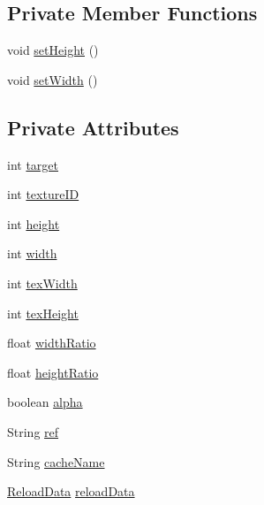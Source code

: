 \subsection*{Private Member Functions}
\begin{DoxyCompactItemize}
\item 
void \mbox{\hyperlink{classorg_1_1newdawn_1_1slick_1_1opengl_1_1_texture_impl_a8a0e3f81daf28807c80daac7e3927808}{set\+Height}} ()
\item 
void \mbox{\hyperlink{classorg_1_1newdawn_1_1slick_1_1opengl_1_1_texture_impl_acac95e7726dd15b2fed3e6370f69f11e}{set\+Width}} ()
\end{DoxyCompactItemize}
\subsection*{Private Attributes}
\begin{DoxyCompactItemize}
\item 
int \mbox{\hyperlink{classorg_1_1newdawn_1_1slick_1_1opengl_1_1_texture_impl_a5809d68afec3342e54fc4520f04a596a}{target}}
\item 
int \mbox{\hyperlink{classorg_1_1newdawn_1_1slick_1_1opengl_1_1_texture_impl_a6dba48b815f4fc5a37e9c4390f349c9e}{texture\+ID}}
\item 
int \mbox{\hyperlink{classorg_1_1newdawn_1_1slick_1_1opengl_1_1_texture_impl_a53e8d062d8f983a3a1a845d34bdbd834}{height}}
\item 
int \mbox{\hyperlink{classorg_1_1newdawn_1_1slick_1_1opengl_1_1_texture_impl_a73412d6372fabe2942ffa281f91a830c}{width}}
\item 
int \mbox{\hyperlink{classorg_1_1newdawn_1_1slick_1_1opengl_1_1_texture_impl_acb22083c60049df21f8e484413d73212}{tex\+Width}}
\item 
int \mbox{\hyperlink{classorg_1_1newdawn_1_1slick_1_1opengl_1_1_texture_impl_afa18dcc63658ee42ca8f6a2822f18c1d}{tex\+Height}}
\item 
float \mbox{\hyperlink{classorg_1_1newdawn_1_1slick_1_1opengl_1_1_texture_impl_a724dda9aa9dc49dee3f80d62cdd68fa9}{width\+Ratio}}
\item 
float \mbox{\hyperlink{classorg_1_1newdawn_1_1slick_1_1opengl_1_1_texture_impl_a8df2772434fe39ed8a5ad06042515385}{height\+Ratio}}
\item 
boolean \mbox{\hyperlink{classorg_1_1newdawn_1_1slick_1_1opengl_1_1_texture_impl_a315687e46129b509c38a9f0ab10adee4}{alpha}}
\item 
String \mbox{\hyperlink{classorg_1_1newdawn_1_1slick_1_1opengl_1_1_texture_impl_af482ec27b29b8846d98ce87bfcd88223}{ref}}
\item 
String \mbox{\hyperlink{classorg_1_1newdawn_1_1slick_1_1opengl_1_1_texture_impl_a2b5b9b6700d8cc41e1bd79adbf2bf8fc}{cache\+Name}}
\item 
\mbox{\hyperlink{classorg_1_1newdawn_1_1slick_1_1opengl_1_1_texture_impl_1_1_reload_data}{Reload\+Data}} \mbox{\hyperlink{classorg_1_1newdawn_1_1slick_1_1opengl_1_1_texture_impl_ad18e1094b8d017aba62758130629ebbc}{reload\+Data}}
\end{DoxyCompactItemize}


